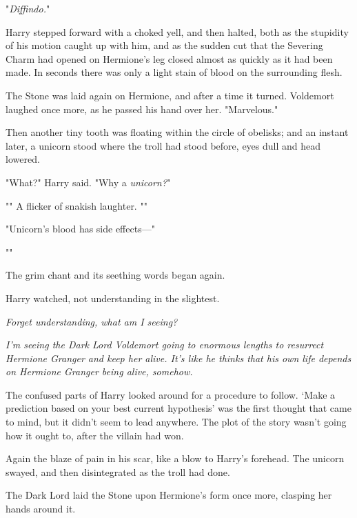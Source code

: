 "\emph{Diffindo.}"

Harry stepped forward with a choked yell, and then halted, both as the
stupidity of his motion caught up with him, and as the sudden cut that the
Severing Charm had opened on Hermione's leg closed almost as quickly as it had
been made. In seconds there was only a light stain of blood on the surrounding
flesh.

The Stone was laid again on Hermione, and after a time it turned. Voldemort
laughed once more, as he passed his hand over her. "Marvelous."

Then another tiny tooth was floating within the circle of obelisks; and an
instant later, a unicorn stood where the troll had stood before, eyes dull and
head lowered.

"What?" Harry said. "Why a \emph{unicorn?}"

"" A flicker of snakish laughter. ""

"Unicorn's blood has side effects---"

""

The grim chant and its seething words began again.

Harry watched, not understanding in the slightest.

\emph{Forget understanding, what am I seeing?}

\emph{I'm seeing the Dark Lord Voldemort going to enormous lengths to resurrect
Hermione Granger and keep her alive. It's like he thinks that his own life
depends on Hermione Granger being alive, somehow.}

The confused parts of Harry looked around for a procedure to follow. `Make a
prediction based on your best current hypothesis' was the first thought that
came to mind, but it didn't seem to lead anywhere. The plot of the story wasn't
going how it ought to, after the villain had won.

Again the blaze of pain in his scar, like a blow to Harry's forehead. The
unicorn swayed, and then disintegrated as the troll had done.

The Dark Lord laid the Stone upon Hermione's form once more, clasping her hands
around it.

